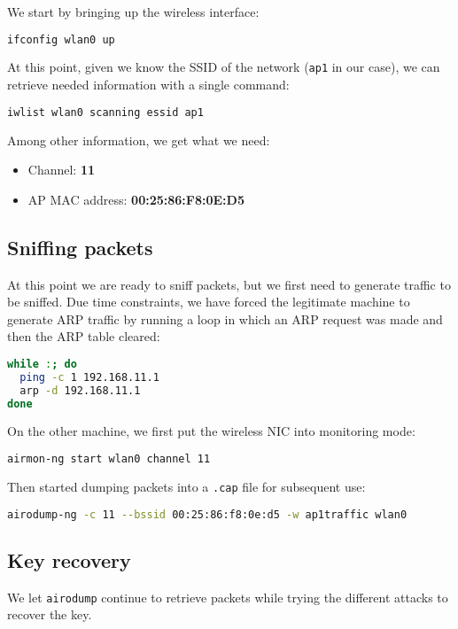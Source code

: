 \documentclass[a4paper,12pt,titlepage]{article}
\begin{document}
We start by bringing up the wireless interface:

\begin{lstlisting}[language=bash]
ifconfig wlan0 up
\end{lstlisting}

At this point, given we know the SSID of the network (\texttt{ap1} in our case), we
can retrieve needed information with a single command:

\begin{lstlisting}[language=bash]
iwlist wlan0 scanning essid ap1
\end{lstlisting}

Among other information, we get what we need:
\begin{itemize}
	\item Channel: \textbf{11}
	\item AP MAC address: \textbf{00:25:86:F8:0E:D5}
\end{itemize}

\subsection*{Sniffing packets}
At this point we are ready to sniff packets, but we first need to generate
traffic to be sniffed. Due time constraints, we have forced the legitimate
machine to generate ARP traffic by running a loop in which an ARP request was
made and then the ARP table cleared:

\begin{lstlisting}[language=bash]
while :; do
  ping -c 1 192.168.11.1
  arp -d 192.168.11.1
done
\end{lstlisting}

On the other machine, we first put the wireless NIC into monitoring mode:

\begin{lstlisting}[language=bash]
airmon-ng start wlan0 channel 11
\end{lstlisting}

Then started dumping packets into a \texttt{.cap} file for subsequent use:

\begin{lstlisting}[language=bash]
airodump-ng -c 11 --bssid 00:25:86:f8:0e:d5 -w ap1traffic wlan0
\end{lstlisting}

\subsection*{Key recovery}
We let \texttt{airodump} continue to retrieve packets while trying the different
attacks to recover the key.
\end{document}
